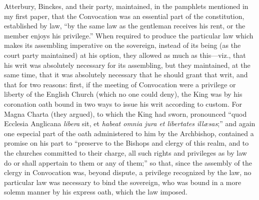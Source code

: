 Atterbury, Binckes, and their
party, maintained, in the pamphlets mentioned in my first paper, that
the Convocation was an essential part of the constitution, established
by law, ``by the same law as the gentleman receives his rent, or the
member enjoys his privilege.'' When required to produce the particular
law which makes its assembling imperative on the sovereign, instead of
its being (as the court party maintained) at his option, they allowed
as much as this—viz., that his writ was absolutely necessary for its
assembling, but they maintained, at the same time, that it was
absolutely necessary that he should grant that writ, and that for two
reasons: first, if the meeting of Convocation were a privilege or
liberty of the English Church (which no one could deny), the King was
by his coronation oath bound in two ways to issue his writ according
to custom. For Magna Charta (they argued), to which the King had
sworn, pronounced ``quod Ecclesia Anglicana \emph{libera} sit, et \emph{habeat
omnia jura et libertates illæsas};'' and again one especial part of
the oath administered to him by the Archbishop, contained a promise on
his part to ``preserve to the Bishops and clergy of this realm, and to
the churches committed to their charge, all such rights and privileges
as by law do or shall appertain to them or any of them;'' so that,
since the assembly of the clergy in Convocation was, beyond dispute, a
privilege recognized by the law, no particular law was necessary to
bind the sovereign, who was bound in a more solemn manner by his
express oath, which the law imposed.

